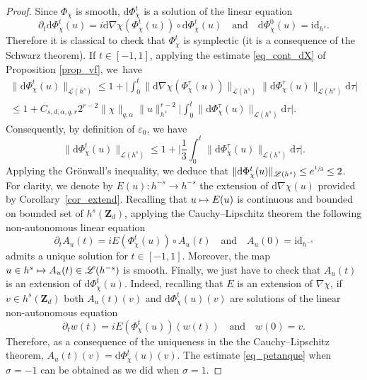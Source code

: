 \documentclass[11pt]{article}
\newcommand\mto{\mathchoice{\longmapsto}{\mapsto}{\mapsto}{\mapsto}}
\theoremstyle{definition}
\begin{document}
\begin{proof}
Since $\Phi_\chi$ is smooth, $\mathrm{d}\Phi_\chi^t$ is a solution of the linear equation
\begin{equation}
\label{eq_lin}
\partial_t \mathrm{d}\Phi_\chi^t(u) = i \mathrm{d}\nabla \chi(\Phi_\chi^t(u))\circ \mathrm{d}\Phi_\chi^t(u) \quad \text{and} \quad \mathrm{d}\Phi_\chi^0(u) = \mathrm{id}_{h^s}.
\end{equation}
Therefore it is classical to check that $\Phi_\chi^t$ is symplectic (it is a consequence of the Schwarz theorem). If $t\in [-1,1]$, applying the estimate \eqref{eq_cont_dX} of Proposition \ref{prop_vf}, we~have
\begin{multline*}
\| \mathrm{d}\Phi_\chi^t(u) \|_{\mathscr{L}(h^s)} \leq 1+ \biggl| \int_0^t \| \mathrm{d}\nabla \chi(\Phi_\chi^\tau(u)) \|_{\mathscr{L}(h^s)} \| \mathrm{d}\Phi_\chi^\tau(u) \|_{\mathscr{L}(h^s)} \mathrm{d}\tau \biggr| \\ \leq 1+ C_{s,d,\alpha,q,r} 2^{r-2} \|\chi \|_{q,\alpha} \|u\|_{h^s}^{r-2}\biggl| \int_0^t \| \mathrm{d}\Phi_\chi^\tau(u) \|_{\mathscr{L}(h^s)} \mathrm{d}\tau \biggr|.
\end{multline*}
Consequently, by definition of $\varepsilon_0$, we have
\[
\| \mathrm{d}\Phi_\chi^t(u) \|_{\mathscr{L}(h^s)} \leq 1+\biggl| \frac13 \int_0^t \| \mathrm{d}\Phi_\chi^\tau(u) \|_{\mathscr{L}(h^s)} \mathrm{d}\tau \biggr|.
\]
Applying the Grönwall's inequality, we deduce that
$\| \mathrm{d}\Phi_\chi^t(u) \|_{\mathscr{L}(h^s)} \leq e^{\sfrac13} \leq 2$.
For clarity, we denote by $E(u):h^{-s}\to h^{-s}$ the extension of $\mathrm{d}\nabla \chi(u)$ provided by Corollary~\ref{cor_extend}. Recalling that $u\mto E(u)$ is continuous and bounded on bounded set of $h^s(\mathbf{Z}_d)$, applying the Cauchy--Lipschitz theorem the following non-autonomous linear equation
\begin{equation*}
\partial_t A_u(t) = iE(\Phi_\chi^t(u))\circ A_u(t) \quad \text{and} \quad A_u(0) = \mathrm{id}_{h^{-s}}
\end{equation*}
admits a unique solution for $t\in [-1,1]$. Moreover, the map $u\in h^s \mto A_u(t) \in \mathscr{L}(h^{-s})$ is smooth. Finally, we just have to check that $A_u(t)$ is an extension of $\mathrm{d}\Phi_\chi^t(u)$. Indeed, recalling that $E$ is an extension of $\nabla \chi$, if $v\in h^s(\mathbf{Z}_d)$ both $A_u(t)(v)$ and $\mathrm{d}\Phi_\chi^t(u)(v)$ are solutions of the linear non-autonomous equation
\[
\partial_t w(t) = i E(\Phi_\chi^t(u))(w(t)) \quad \text{and} \quad w(0) = v.
\]
Therefore, as a consequence of the uniqueness in the the Cauchy--Lipschitz theorem, $A_u(t)(v) =\mathrm{d}\Phi_\chi^t(u)(v)$. The estimate \eqref{eq_petanque} when $\sigma=-1$ can be obtained as we did when $\sigma=1$.
\end{proof}
\end{document}
